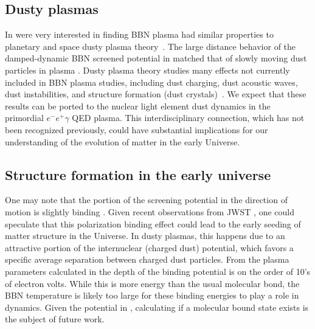 \subsection{Dusty plasmas}
In \cite{Grayson:2023flr} were very interested in finding BBN plasma had similar properties to planetary and space dusty plasma theory~\cite{Montgomery:1970jpp,Stenflo:1973,Shukla:2002ppcf,Lampe:2000pop}. The large distance behavior of the damped-dynamic BBN screened potential in  matched that of slowly moving dust particles in plasma \cite{Stenflo:1973}. Dusty plasma theory studies many effects not currently included in BBN plasma studies, including dust charging, dust acoustic waves, dust instabilities, and structure formation (dust crystals)~\cite{Shukla:2002ppcf}. We expect that these results can be ported to the nuclear light element dust dynamics in the primordial $e^-e^+\gamma$ QED plasma. This interdisciplinary connection, which has not been recognized previously, could have substantial implications for our understanding of the evolution of matter in the early Universe.

\subsection{Structure formation in the early universe}
One may note that the portion of the screening potential in the direction of motion is slightly binding .
Given recent observations from JWST \cite{ferreira2023jwst}, one could speculate that this polarization binding effect could lead to the early seeding of matter structure in the Universe. In dusty plasmas, this happens due to an attractive portion of the internuclear (charged dust) potential, which favors a specific average separation between charged dust particles. From the plasma parameters calculated in \cite{Grayson:2023flr} the depth of the binding potential is on the order of 10's of electron volts. While this is more energy than the usual molecular bond, the BBN temperature is likely too large for these binding energies to play a role in dynamics. Given the potential in , calculating if a molecular bound state exists is the subject of future work.

